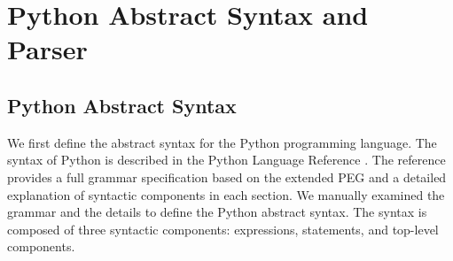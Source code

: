 \section{Python Abstract Syntax and Parser}\label{sec:pysyn}
\subsection{Python Abstract Syntax}

We first define the abstract syntax for the Python programming language.
The syntax of Python is described in the Python Language Reference \cite{pythonref}.
The reference provides a full grammar specification based on the extended PEG
and a detailed explanation of syntactic components in each section.
We manually examined the grammar and the details
to define the Python abstract syntax.
The syntax is composed of three syntactic components: expressions, statements,
and top-level components.

